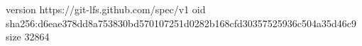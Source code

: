 version https://git-lfs.github.com/spec/v1
oid sha256:d6eae378dd8a753830bd570107251d0282b168cfd30357525936c504a35d46c9
size 32864
